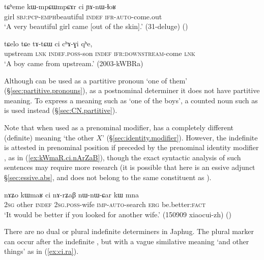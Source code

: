 \begin{exe}
\ex \label{ex:ci.indef}
\gll tɕʰeme kɯ-mpɕɯ\redp{}mpɕɤr ci ɲɤ-nɯ-ɬoʁ \\
girl \textsc{sbj}:\textsc{pcp}-\textsc{emph}\redp{}beautiful \textsc{indef} \textsc{ifr}-\textsc{auto}-come.out \\
\glt `A very beautiful girl came [out of the skin].' (31-deluge) ()
\end{exe}

\begin{exe}
\ex \label{ex:ci.chAGi}
\gll tɕelo tɕe tɤ-tɕɯ ci cʰɤ-ɣi qʰe, \\
upstream \textsc{lnk} \textsc{indef}.\textsc{poss}-son \textsc{indef} \textsc{ifr}:\textsc{downstream}-come \textsc{lnk} \\
\glt `A boy came from upstream.' (2003-kWBRa)
\end{exe}

Although  can be used as a partitive pronoun `one of them' (§\ref{sec:partitive.pronouns}), as a postnominal determiner it does not have partitive meaning. To express a meaning such as `one of the boys', a counted noun such as  is used instead (§\ref{sec:CN.partitive}). 

Note that when used as a prenominal modifier,  has a completely different (definite) meaning `the other $X$' (§\ref{sec:identity.modifier}). However, the indefinite  is attested in prenominal position if preceded by the prenominal identity modifier , as in (\ref{ex:kWmaR.ci.nArZaB}), though the exact syntactic analysis of such sentences may require more research (it is possible that  here is an essive adjunct §\ref{sec:essive.abs}, and does not belong to the same constituent as ).

\begin{exe}
\ex \label{ex:kWmaR.ci.nArZaB}
\gll  nɤʑo kɯmaʁ ci nɤ-rʑaβ nɯ-nɯ-ɕar kɯ mna  \\
\textsc{2sg} other \textsc{indef} \textsc{2sg}.\textsc{poss}-wife \textsc{imp}-\textsc{auto}-search \textsc{erg} be.better:\textsc{fact} \\
\glt `It would be better if you looked for another wife.' (150909 xiaocui-zh)
()
\end{exe}

There are no dual or plural indefinite determiners in Japhug. The plural marker  can occur after the indefinite , but with a vague similative meaning `and other things' as in (\ref{ex:ci.ra}).

